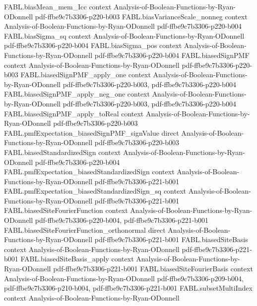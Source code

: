 \begin{theorem}
  {FABL.biasMean_mem_Icc}
  {context}
  {Analysis-of-Boolean-Functions-by-Ryan-ODonnell}
  {pdf-ffbe9c7b3306-p220-b003}
\proofstep
  {FABL.biasVarianceScale_nonneg}
  {context}
  {Analysis-of-Boolean-Functions-by-Ryan-ODonnell}
  {pdf-ffbe9c7b3306-p220-b004}
\proofstep
  {FABL.biasSigma_sq}
  {context}
  {Analysis-of-Boolean-Functions-by-Ryan-ODonnell}
  {pdf-ffbe9c7b3306-p220-b004}
\proofstep
  {FABL.biasSigma_pos}
  {context}
  {Analysis-of-Boolean-Functions-by-Ryan-ODonnell}
  {pdf-ffbe9c7b3306-p220-b004}
\proofstep
  {FABL.biasedSignPMF}
  {context}
  {Analysis-of-Boolean-Functions-by-Ryan-ODonnell}
  {pdf-ffbe9c7b3306-p220-b003}
\proofstep
  {FABL.biasedSignPMF_apply_one}
  {context}
  {Analysis-of-Boolean-Functions-by-Ryan-ODonnell}
  {pdf-ffbe9c7b3306-p220-b003,
    pdf-ffbe9c7b3306-p220-b004}
\proofstep
  {FABL.biasedSignPMF_apply_neg_one}
  {context}
  {Analysis-of-Boolean-Functions-by-Ryan-ODonnell}
  {pdf-ffbe9c7b3306-p220-b003,
    pdf-ffbe9c7b3306-p220-b004}
\proofstep
  {FABL.biasedSignPMF_apply_toReal}
  {context}
  {Analysis-of-Boolean-Functions-by-Ryan-ODonnell}
  {pdf-ffbe9c7b3306-p220-b003}
\proofstep
  {FABL.pmfExpectation_biasedSignPMF_signValue}
  {direct}
  {Analysis-of-Boolean-Functions-by-Ryan-ODonnell}
  {pdf-ffbe9c7b3306-p220-b003}
\proofstep
  {FABL.biasedStandardizedSign}
  {context}
  {Analysis-of-Boolean-Functions-by-Ryan-ODonnell}
  {pdf-ffbe9c7b3306-p220-b004}
\proofstep
  {FABL.pmfExpectation_biasedStandardizedSign}
  {context}
  {Analysis-of-Boolean-Functions-by-Ryan-ODonnell}
  {pdf-ffbe9c7b3306-p221-b001}
\proofstep
  {FABL.pmfExpectation_biasedStandardizedSign_sq}
  {context}
  {Analysis-of-Boolean-Functions-by-Ryan-ODonnell}
  {pdf-ffbe9c7b3306-p221-b001}
\proofstep
  {FABL.biasedSiteFourierFunction}
  {context}
  {Analysis-of-Boolean-Functions-by-Ryan-ODonnell}
  {pdf-ffbe9c7b3306-p220-b004,
    pdf-ffbe9c7b3306-p221-b001}
\proofstep
  {FABL.biasedSiteFourierFunction_orthonormal}
  {direct}
  {Analysis-of-Boolean-Functions-by-Ryan-ODonnell}
  {pdf-ffbe9c7b3306-p221-b001}
\proofstep
  {FABL.biasedSiteBasis}
  {context}
  {Analysis-of-Boolean-Functions-by-Ryan-ODonnell}
  {pdf-ffbe9c7b3306-p221-b001}
\proofstep
  {FABL.biasedSiteBasis_apply}
  {context}
  {Analysis-of-Boolean-Functions-by-Ryan-ODonnell}
  {pdf-ffbe9c7b3306-p221-b001}
\proofstep
  {FABL.biasedSiteFourierBasis}
  {context}
  {Analysis-of-Boolean-Functions-by-Ryan-ODonnell}
  {pdf-ffbe9c7b3306-p209-b004,
    pdf-ffbe9c7b3306-p210-b004,
    pdf-ffbe9c7b3306-p221-b001}
\proofstep
  {FABL.subsetMultiIndex}
  {context}
  {Analysis-of-Boolean-Functions-by-Ryan-ODonnell}

\end{theorem}
